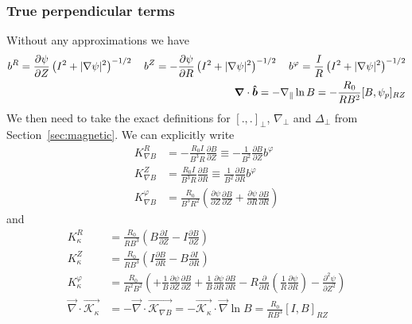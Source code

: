 \subsubsection{True perpendicular terms}
Without any approximations we have
\begin{align}
b^R = {\frac{\partial \psi}{\partial Z}}\left(I^2+|\nabla\psi|^2\right)^{-1/2} \quad
b^Z = -{\frac{\partial \psi}{\partial R}}\left(I^2+|\nabla\psi|^2\right)^{-1/2} \quad 
b^\varphi = \frac{I}{R}\left(I^2+|\nabla\psi|^2\right)^{-1/2} \\
{\boldsymbol{\nabla}}\cdot\bm{\hat{b}} = -\nabla_\parallel \ln B = -\frac{R_0}{R B^2}[B,\psi_p]_{RZ}
\label{}
\end{align}
We then need to take the exact definitions for $[.,.]_\perp$, $\nabla_\perp$ and $\Delta_\perp$ from Section~\ref{sec:magnetic}.
We can explicitly write
\begin{align}
K_{\nabla B}^R &= -\frac{R_0 I}{B^3R}\frac{\partial B}{\partial Z} \equiv -\frac{1}{B^2}\frac{\partial B}{\partial Z}b^\varphi \\
K_{\nabla B}^Z &= \frac{R_0 I}{B^3R}\frac{\partial B}{\partial R}\equiv \frac{1}{B^2}\frac{\partial B}{\partial R}b^\varphi \\
K_{\nabla B}^\varphi &= \frac{R_0}{B^3R^2}\left(
      \frac{\partial \psi}{\partial Z} \frac{\partial B}{\partial Z}
    + \frac{\partial \psi}{\partial R}\frac{\partial B}{\partial R}\right)
\label{}
\end{align}
and
\begin{align}
K_\kappa^R &= \frac{R_0 }{RB^3}\left( B\frac{\partial I}{\partial Z} -I\frac{\partial B}{\partial Z}\right) \\
K_\kappa^Z &= \frac{R_0 }{RB^3} \left( I\frac{\partial B}{\partial R} - B\frac{\partial I}{\partial R} \right)\\
K_\kappa^\varphi &= \frac{R_0}{R^2B^2}\left(
+ \frac{1}{B}\frac{\partial\psi}{\partial Z} \frac{\partial B}{\partial Z}
+ \frac{1}{B}\frac{\partial \psi}{\partial R}\frac{\partial B}{\partial R}
-R\frac{\partial}{\partial R}\left(\frac{1}{R}\frac{\partial\psi}{\partial R}\right) 
- \frac{\partial^2 \psi}{\partial Z^2}
\right) \\
\vec\nabla\cdot\vec{\mathcal K_\kappa} &= -\vec\nabla\cdot\vec{\mathcal K_{\nabla B}}=
    -\vec{\mathcal K_\kappa}\cdot \vec \nabla\ln B = \frac{R_0}{RB^3}[I,B]_{RZ}
\label{}
\end{align}

